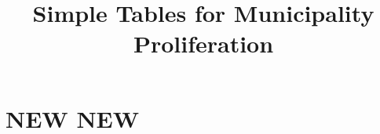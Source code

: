 \documentclass{article}
\title{Simple Tables for Municipality Proliferation}
\begin{document}
\maketitle
\tableofcontents
{\footnotesize 
\listoffigures
\listoftables}
\clearpage

\section{NEW NEW}

\begin{table}[htbp]\centering {}  \begin{threeparttable} \caption{Total Black Balance}
\footnotesize

\end{threeparttable}  \end{table}
\clearpage

\begin{table}[htbp]\centering {}  \begin{threeparttable} \caption{Total White  Balance}
\footnotesize

\end{threeparttable}  \end{table}
\clearpage


\begin{table}[htbp]\centering {}  \begin{threeparttable} \caption{Total Black County Balance}
\footnotesize

\end{threeparttable}  \end{table}
\clearpage

\begin{table}[htbp]\centering {}  \begin{threeparttable} \caption{Total White County Balance}
\footnotesize

\end{threeparttable}  \end{table}
\clearpage


\begin{table}[htbp]\centering {}  \begin{threeparttable} \caption{Main Results, Black}
\footnotesize

\end{threeparttable}  \end{table}
\clearpage
\end{document}
